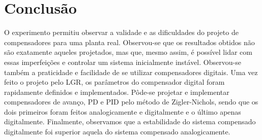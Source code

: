 \section{Conclusão}
 O experimento permitiu observar a validade e as dificuldades
 do projeto de compensadores para uma planta real. Observou-se que os resultados obtidos não são exatamente aqueles projetados, mas que, mesmo assim, é possível lidar com essas imperfeições e  controlar um sistema inicialmente instável. Observou-se também a praticidade e facilidade de se utilizar compensadores digitais. Uma vez feito o projeto pelo LGR, os parâmetros do compensador digital foram rapidamente definidos e implementados. Pôde-se projetar e implementar compensadores de avanço, PD e PID pelo método de Zigler-Nichols, sendo que os dois primeiros foram feitos analogicamente e digitalmente e o último apenas digitalmente. Finalmente, observamos que a estabilidade do sistema compensado digitalmente foi superior aquela do sistema compensado analogicamente.